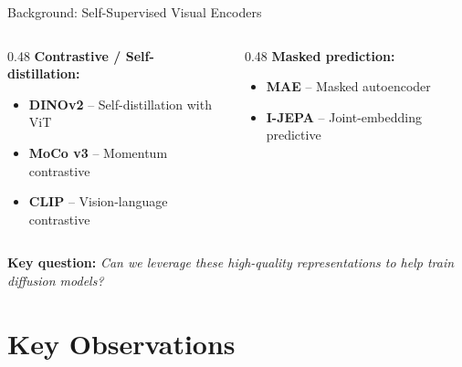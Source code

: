 \documentclass[aspectratio=169, 10pt]{beamer}
\begin{document}
\begin{frame}{Background: Self-Supervised Visual Encoders}
\small
\begin{columns}[T]
\begin{column}{0.48\textwidth}
\textbf{Contrastive / Self-distillation:}
\begin{itemize}\setlength{\itemsep}{1pt}
  \item \textbf{DINOv2} -- Self-distillation with ViT
  \item \textbf{MoCo v3} -- Momentum contrastive
  \item \textbf{CLIP} -- Vision-language contrastive
\end{itemize}
\end{column}
\begin{column}{0.48\textwidth}
\textbf{Masked prediction:}
\begin{itemize}\setlength{\itemsep}{1pt}
  \item \textbf{MAE} -- Masked autoencoder
  \item \textbf{I-JEPA} -- Joint-embedding predictive
\end{itemize}
\end{column}
\end{columns}

\vspace{0.6em}
\textbf{Key question:} \textit{Can we leverage these high-quality representations to help train diffusion models?}

\vspace{0.4em}
\begin{center}
\end{center}
\end{frame}

\section{Key Observations}
\end{document}

